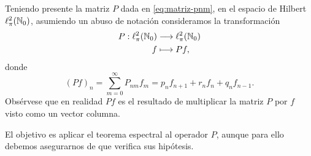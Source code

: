     Teniendo presente la matriz $P$ dada en \eqref{eq:matriz-pnm}, en el espacio de Hilbert $\ell^2_\pi(\mathbb{N}_0)$, asumiendo un abuso de notación consideramos la transformación
    \begin{equation}
        \label{eq:operador-P}
        \begin{split}
            P : \ell^2_\pi(\mathbb{N}_0) & \longrightarrow \ell^2_\pi(\mathbb{N}_0) \\
            f & \longmapsto Pf,
        \end{split}
    \end{equation}
    donde
    $$
    (Pf)_n = \sum_{m=0}^\infty P_{nm} f_m = p_n f_{n+1} + r_n f_n + q_n f_{n-1}. 
    $$
    Obsérvese que en realidad $Pf$ es el resultado de multiplicar la matriz $P$ por $f$ visto como un vector columna.

    El objetivo es aplicar el teorema espectral al operador $P$, aunque para ello debemos asegurarnos de que verifica sus hipótesis.

